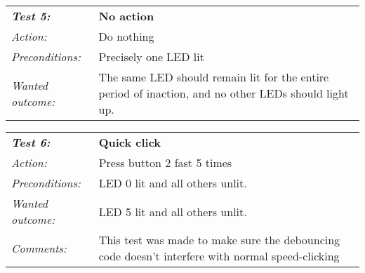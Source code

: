 \vspace{1cm}

\begin{tabular}[h]{|lp{12cm}|} \hline
\textbf{\emph{Test 5:}} 		& \textbf{No action}\\
\emph{Action:} 		& Do nothing\\
\emph{Preconditions:}	& Precisely one LED lit\\
\emph{Wanted outcome:}	& The same LED should remain lit for the entire period of inaction, and no other LEDs should light up.\\ \hline
\end{tabular}

\vspace{1cm}

\begin{tabular}[h]{|lp{12cm}|} \hline
\textbf{\emph{Test 6:}} 		& \textbf{Quick click}\\
\emph{Action:} 		& Press button 2 fast 5 times\\
\emph{Preconditions:}	& LED 0 lit and all others unlit.\\
\emph{Wanted outcome:}	& LED 5 lit and all others unlit.\\
\emph{Comments:}		& This test was made to make sure the debouncing code doesn’t interfere with normal speed-clicking \\ \hline
\end{tabular}
